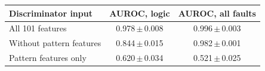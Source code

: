 \begin{tabular}{lcc}
\toprule
\textbf{Discriminator input} & \textbf{AUROC, logic} & \textbf{AUROC, all faults}\\
\midrule
All 101 features & 0.978\,$\pm$\,0.008 & 0.996\,$\pm$\,0.003\\
Without pattern features & 0.844\,$\pm$\,0.015 & 0.982\,$\pm$\,0.001\\
Pattern features only & 0.620\,$\pm$\,0.034 & 0.521\,$\pm$\,0.025\\\bottomrule
\end{tabular}
